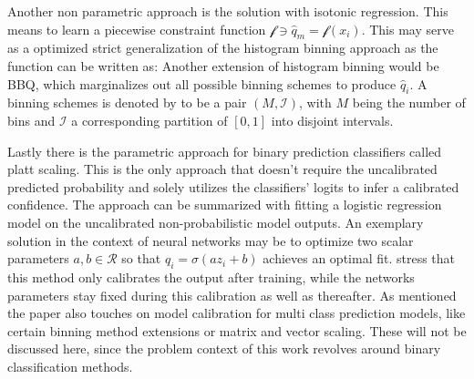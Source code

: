 Another non parametric approach is the solution with isotonic regression. This means to learn a piecewise constraint function $\mathcal{f} \ni \hat{q}_m = \mathcal{f}(x_i)$. This may serve as a 
optimized strict generalization of the histogram binning approach as the function can be written as: %
Another extension of histogram binning would be BBQ, which marginalizes out all possible binning schemes to produce $\hat{q}_i$. A binning schemes 
is denoted by \cite{Guo_2017_tempscalingetc} to be a pair $(M, \mathcal{I})$, with $M$ being the number of bins and $\mathcal{I}$ a corresponding partition of $[0, 1]$ into disjoint intervals. 


Lastly there is the parametric approach for binary prediction classifiers called platt scaling. This is the only approach that doesn't require the uncalibrated predicted probability and solely utilizes 
the classifiers' logits to infer a calibrated confidence. The approach can be summarized with fitting a logistic regression model on the uncalibrated non-probabilistic model outputs. An exemplary 
solution in the context of neural networks may be to optimize two scalar parameters $a, b \in \mathcal{R}$ so that $\hat{q}_i = \sigma(az_i + b)$ achieves an optimal fit. \cite{Guo_2017_tempscalingetc} 
stress that this method only calibrates the output after training, while the networks parameters stay fixed during this calibration as well as thereafter.
\newline
As mentioned the paper also touches on model calibration for multi class prediction models, like certain binning method extensions or matrix and vector scaling. These will not be discussed here, 
since the problem context of this work revolves around binary classification methods.


